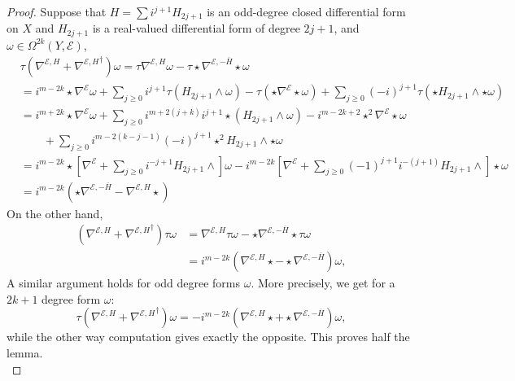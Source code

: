 \documentclass[12pt]{amsart}
\theoremstyle{plain}
\theoremstyle{definition}
\theoremstyle{remark}
\begin{document}
\begin{proof} 
{{Suppose that $H = \sum i^{j+1} H_{2j+1} $ is an 
odd-degree closed differential form on $X$ and $H_{2j+1}$ is a real-valued differential form 
of degree ${2j+1}$, and  $\omega \in \Omega^{2k}(Y, {\mathcal E})$,}}
\begin{align*}
& \tau (\nabla^{{\mathcal E}, H} + {\nabla^{{\mathcal E}, H}}^\dagger) \omega =  \tau \nabla^{{\mathcal E}, H}\omega - \tau \star {\nabla^{{\mathcal E}, -\overline H}}\star\omega \\
 & = i^{m-2k} \star \nabla^{\mathcal E}\omega + \sum_{j\ge 0} i^{j+1} \tau( H_{2j+1} \wedge \omega) 
 - \tau(\star \nabla^{\mathcal E} \star \omega) + \sum_{j\ge 0} {{(-i)}}^{j+1} \tau( \star H_{2j+1} \wedge \star \omega) \\
 & = i^{m+2k} \star \nabla^{\mathcal E} \omega +\sum_{j\ge 0}  i^{m+2(j+k)} i^{j+1} \star( H_{2j+1} \wedge \omega) 
 - i^{m-2k+2} \star^2 \nabla^{\mathcal E} \star \omega\\
 & \qquad + \sum_{j\ge 0}  i^{m-2(k-j-1)} {{(-i)}}^{j+1} \star^2 H_{2j+1} \wedge \star \omega \\
 & =  i^{m-2k} \star \left[ \nabla^{\mathcal E}  + \sum_{j\ge 0}  i^{-j+1}  H_{2j+1} \wedge\right]\omega
 -  i^{m-2k}  \left[ \nabla^{\mathcal E}  + \sum_{j\ge 0}  (-1)^{j+1} i^{-(j+1)}  H_{2j+1} \wedge\right]\star \omega\\
 & =   i^{m-2k} \left(\star \nabla^{{\mathcal E}, -\overline H} - \nabla^{{\mathcal E}, H} \star\right)
 \end{align*}
 On the other hand,
 \begin{align*}
(\nabla^{{\mathcal E}, H} + {\nabla^{{\mathcal E}, H}}^\dagger) \tau \omega & = \nabla^{{\mathcal E}, H}  \tau \omega - \star \nabla^{{\mathcal E}, -\overline H}
\star \tau \omega \\
& = {{i^{m-2k} \left( \nabla^{{\mathcal E}, H}  \star -  \star \nabla^{{\mathcal E}, -\overline H}\right)\omega}},
 \end{align*} 
A similar argument holds for odd degree forms $\omega$. More precisely, we get for a $2k+1$ degree form $\omega$:
$$
\tau (\nabla^ {{\mathcal E}, H} + {\nabla^{{\mathcal E}, H}}^\dagger )\omega ={{-i^{m-2k} (\nabla^{{\mathcal E}, H} \star + \star \nabla^{{\mathcal E}, -{\overline H}}) \omega}},
$$
while the other way computation gives exactly the opposite. 
This proves half the lemma. \\


\end{proof}
\end{document}
